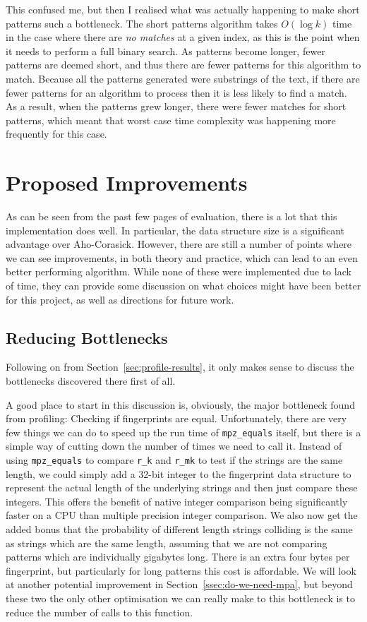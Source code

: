 \documentclass[ %
                    author={Dominic Joseph Moylett},
                    degree={MEng},
                     title={Dictionary Matching with Fingerprints},
                  subtitle={An Empirical Analysis},
                      type={research},
                      year={2015} ]{dissertation}
\begin{document}
This confused me, but then I realised what was actually happening to make short patterns such a bottleneck. The short patterns algorithm takes $O(\log k)$ time in the case where there are \textit{no matches} at a given index, as this is the point when it needs to perform a full binary search. As patterns become longer, fewer patterns are deemed short, and thus there are fewer patterns for this algorithm to match. Because all the patterns generated were substrings of the text, if there are fewer patterns for an algorithm to process then it is less likely to find a match. As a result, when the patterns grew longer, there were fewer matches for short patterns, which meant that worst case time complexity was happening more frequently for this case.

\section{Proposed Improvements}

As can be seen from the past few pages of evaluation, there is a lot that this implementation does well. In particular, the data structure size is a significant advantage over Aho-Corasick. However, there are still a number of points where we can see improvements, in both theory and practice, which can lead to an even better performing algorithm. While none of these were implemented due to lack of time, they can provide some discussion on what choices might have been better for this project, as well as directions for future work.

\subsection{Reducing Bottlenecks}
\label{sec:reduce-bottle}

Following on from Section~\ref{sec:profile-results}, it only makes sense to discuss the bottlenecks discovered there first of all.

A good place to start in this discussion is, obviously, the major bottleneck found from profiling: Checking if fingerprints are equal. Unfortunately, there are very few things we can do to speed up the run time of \texttt{mpz\_equals} itself, but there is a simple way of cutting down the number of times we need to call it. Instead of using \texttt{mpz\_equals} to compare \texttt{r\_k} and \texttt{r\_mk} to test if the strings are the same length, we could simply add a 32-bit integer to the fingerprint data structure to represent the actual length of the underlying strings and then just compare these integers. This offers the benefit of native integer comparison being significantly faster on a CPU than multiple precision integer comparison. We also now get the added bonus that the probability of different length strings colliding is the same as strings which are the same length, assuming that we are not comparing patterns which are individually gigabytes long. There is an extra four bytes per fingerprint, but particularly for long patterns this cost is affordable. We will look at another potential improvement in Section~\ref{ssec:do-we-need-mpa}, but beyond these two the only other optimisation we can really make to this bottleneck is to reduce the number of calls to this function.
\end{document}
